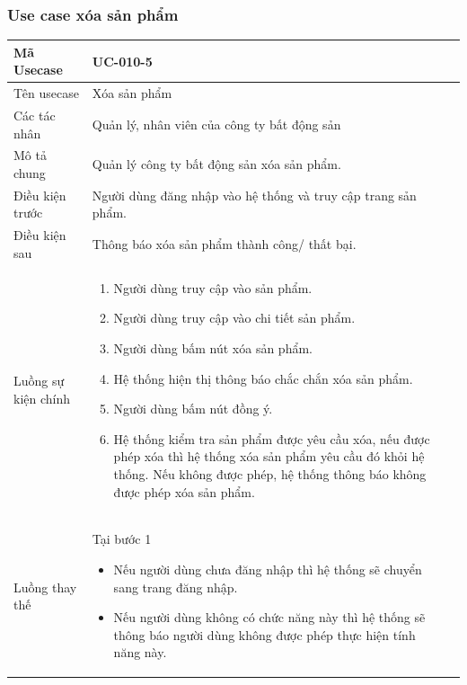 \documentclass[12pt,a4paper]{article}
\begin{document}
    \subsubsection*{Use case xóa sản phẩm }
    \begin{table}[H]
        \centering
        \begin{tabular}{|p{3.5cm}|p{11.5cm}|c|}
            \hline
            Mã Usecase      & UC-010-5                                                      \\
            \hline
            Tên usecase     & Xóa sản phẩm                                                  \\
            \hline
            Các tác nhân    & Quản lý, nhân viên của công ty bất động sản                   \\
            \hline
            Mô tả chung     & Quản lý công ty bất động sản xóa sản phẩm.                    \\
            \hline

            Điều kiện trước & Người dùng đăng nhập vào hệ thống và truy cập trang sản phẩm. \\
            \hline

            Điều kiện sau   & Thông báo xóa sản phẩm thành công/ thất bại.                  \\
            \hline

            Luồng sự kiện chính & \vspace{-.8cm}\begin{enumerate}
                                                    \item Người dùng truy cập vào sản phẩm.
                                                    \item Người dùng truy cập vào chi tiết sản phẩm.
                                                    \item  Người dùng bấm nút xóa sản phẩm.
                                                    \item  Hệ thống hiện thị thông báo chắc chắn xóa sản phẩm.
                                                    \item  Người dùng bấm nút đồng ý.
                                                    \item Hệ thống kiểm tra sản phẩm được yêu cầu xóa, nếu được phép xóa thì hệ thống xóa sản phẩm yêu cầu đó khỏi hệ thống. Nếu không được phép, hệ thống thông báo không được phép xóa sản phẩm.
            \end{enumerate}
            \\
            \hline
            Luồng thay thế & Tại bước 1\newline
            \vspace{-.8cm}\begin{itemize}
                              \item Nếu người dùng chưa đăng nhập thì hệ thống sẽ chuyển sang trang đăng nhập.
                              \item Nếu người dùng không có chức năng này thì hệ thống sẽ thông báo người dùng không được phép thực hiện tính năng này.
            \end{itemize}


\end{tabular}
\end{table}
\end{document}
